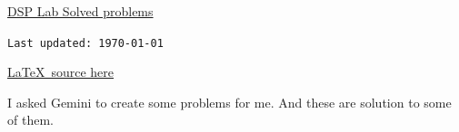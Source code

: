 \documentclass[11pt,a4paper]{article}
\newcommand{\note}[1]{%
	\begin{tcolorbox}[colframe=orange!75!black]
		#1
	\end{tcolorbox}
}
\begin{document}
\begin{center}
	{\Huge \normalfont \underline{DSP Lab Solved problems}}
	
	\vspace*{10pt}
	\texttt{Last updated: \today\ \DTMcurrenttime}
	
	\href{https://github.com/roopeshor/Typesetting/tree/main/Lab/DSP}{\LaTeX\ source here}
	\vspace*{10pt}
\end{center}
\note{I asked Gemini to create some problems for me. And these are solution to some of them.}
\begin{center}
	{\let\clearpage\relax \tableofcontents}
\end{center}



{}
\setlength{\parindent}{0pt}




% 

\end{document}
